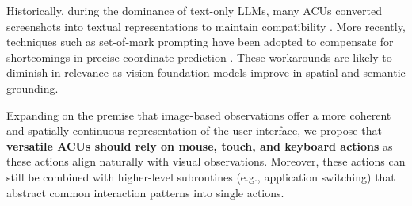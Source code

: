 Historically, during the dominance of text-only LLMs, many ACUs converted screenshots into textual representations to maintain compatibility .  More recently, techniques such as set-of-mark prompting have been adopted to compensate for shortcomings in precise coordinate prediction .
These workarounds are likely to diminish in relevance as vision foundation models improve in spatial and semantic grounding.

Expanding on the premise that image-based observations offer a more coherent and spatially continuous representation of the user interface, we propose that \textbf{versatile ACUs should rely on mouse, touch, and keyboard actions} as these actions align naturally with visual observations.
Moreover, these actions can still be combined with higher-level subroutines (e.g., application switching) that abstract common interaction patterns into single actions.
